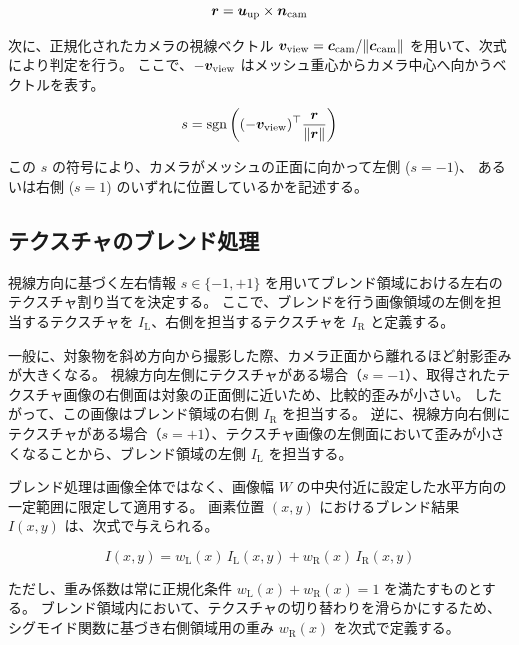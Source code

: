 \begin{equation}
  \bm{r} = \bm{u}_{\rm up} \times \bm{n}_{\rm cam}
\end{equation}

次に、正規化されたカメラの視線ベクトル $\bm{v}_{\rm view} = \bm{c}_{\rm cam} / \|\bm{c}_{\rm cam}\|$ を用いて、次式により判定を行う。
ここで、$-\bm{v}_{\rm view}$ はメッシュ重心からカメラ中心へ向かうベクトルを表す。

\begin{equation}
  s = \mathrm{sgn}\left( (-\bm{v}_{\rm view})^\top \frac{\bm{r}}{\|\bm{r}\|} \right)
\end{equation}

この $s$ の符号により、カメラがメッシュの正面に向かって左側 ($s=-1$)、
あるいは右側 ($s=1$) のいずれに位置しているかを記述する。

\subsection{テクスチャのブレンド処理}

視線方向に基づく左右情報 $s \in \{-1, +1\}$ を用いてブレンド領域における左右のテクスチャ割り当てを決定する。
ここで、ブレンドを行う画像領域の左側を担当するテクスチャを $I_{\mathrm{L}}$、右側を担当するテクスチャを $I_{\mathrm{R}}$ と定義する。

一般に、対象物を斜め方向から撮影した際、カメラ正面から離れるほど射影歪みが大きくなる。
視線方向左側にテクスチャがある場合（$s=-1$）、取得されたテクスチャ画像の右側面は対象の正面側に近いため、比較的歪みが小さい。
したがって、この画像はブレンド領域の右側 $I_{\mathrm{R}}$ を担当する。
逆に、視線方向右側にテクスチャがある場合（$s=+1$）、テクスチャ画像の左側面において歪みが小さくなることから、ブレンド領域の左側 $I_{\mathrm{L}}$ を担当する。

ブレンド処理は画像全体ではなく、画像幅 $W$ の中央付近に設定した水平方向の一定範囲に限定して適用する。
画素位置 $(x, y)$ におけるブレンド結果 $I(x, y)$ は、次式で与えられる。

\begin{equation}
  I(x, y) = w_{\mathrm{L}}(x)\, I_{\mathrm{L}}(x, y) + w_{\mathrm{R}}(x)\, I_{\mathrm{R}}(x, y)
  \label{eq:blend_func}
\end{equation}

ただし、重み係数は常に正規化条件 $w_{\mathrm{L}}(x) + w_{\mathrm{R}}(x) = 1$ を満たすものとする。
ブレンド領域内において、テクスチャの切り替わりを滑らかにするため、シグモイド関数に基づき右側領域用の重み $w_{\mathrm{R}}(x)$ を次式で定義する。

